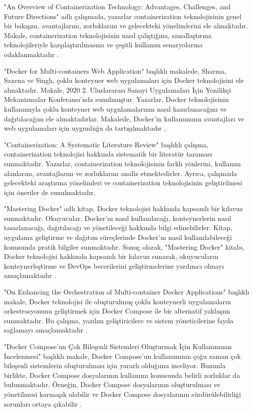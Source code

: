 "An Overview of Containerization Technology: Advantages, Challenges, and Future Directions" adlı çalışmada, yazarlar containerization teknolojisinin genel bir bakışını, avantajlarını, zorluklarını ve gelecekteki yönelimlerini ele almaktadır. Makale, containerization teknolojisinin nasıl çalıştığına, sanallaştırma teknolojileriyle karşılaştırılmasına ve çeşitli kullanım senaryolarına odaklanmaktadır \cite{Smith_Emily}.

"Docker for Multi-containers Web Application" başlıklı makalede, Sharma, Saxena ve Singh, çoklu konteyner web uygulamaları için Docker teknolojisini ele almaktadır. Makale, 2020 2. Uluslararası Sanayi Uygulamaları İçin Yenilikçi Mekanizmalar Konferansı'nda sunulmuştur. Yazarlar, Docker teknolojisinin kullanımıyla çoklu konteyner web uygulamalarının nasıl hazırlanacağını ve dağıtılacağını ele almaktadırlar. Makalede, Docker'in kullanımının avantajları ve web uygulamaları için uygunluğu da tartışılmaktadır \cite{sharma2020docker}.

"Containerization: A Systematic Literature Review" başlıklı çalışma, containerization teknolojisi hakkında sistematik bir literatür taraması sunmaktadır. Yazarlar, containerization teknolojisinin farklı yönlerini, kullanım alanlarını, avantajlarını ve zorluklarını analiz etmektedirler. Ayrıca, çalışmada gelecekteki araştırma yönelimleri ve containerization teknolojisinin geliştirilmesi için öneriler de sunulmaktadır.\cite{Brown_Jennifer}

"Mastering Docker" adlı kitap, Docker teknolojisi hakkında kapsamlı bir kılavuz sunmaktadır. Okuyucular, Docker'ın nasıl kullanılacağı, konteynerlerin nasıl tasarlanacağı, dağıtılacağı ve yönetileceği hakkında bilgi edinebilirler. Kitap, uygulama geliştirme ve dağıtım süreçlerinde Docker'ın nasıl kullanılabileceği konusunda pratik bilgiler sunmaktadır. Sonuç olarak, "Mastering Docker" kitabı, Docker teknolojisi hakkında kapsamlı bir kılavuz sunarak, okuyucuların konteynerleştirme ve DevOps becerilerini geliştirmelerine yardımcı olmayı amaçlamaktadır \cite{mckendrick2020mastering}.

"On Enhancing the Orchestration of Multi-container Docker Applications" başlıklı makale, Docker teknolojisi ile oluşturulmuş çoklu konteynerli uygulamaların orkestrasyonunu geliştirmek için Docker Compose ile bir alternatif yaklaşım sunmaktadır. Bu çalışma, yazılım geliştiricilere ve sistem yöneticilerine fayda sağlamayı amaçlamaktadır \cite{brogi2020enhancing}.

"Docker Compose'un Çok Bileşenli Sistemleri Oluşturmak İçin Kullanımının İncelenmesi" başlıklı makale, Docker Compose'un kullanımının çoğu zaman çok bileşenli sistemlerin oluşturulması için yararlı olduğunu inceliyor. Bununla birlikte, Docker Compose dosyalarının kullanımı konusunda belirli zorluklar da bulunmaktadır. Örneğin, Docker Compose dosyalarının oluşturulması ve yönetilmesi karmaşık olabilir ve Docker Compose dosyalarının sürdürülebilirliği sorunları ortaya çıkabilir \cite{ibrahim2021study}.

